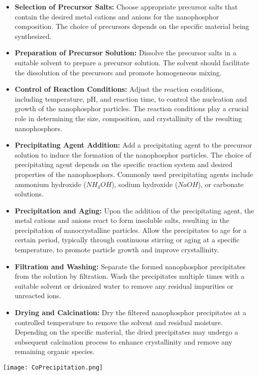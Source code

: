 \documentclass[../synthesis.tex]{subfiles}
\begin{document}
    \begin{itemize}
        \item \textbf{Selection of Precursor Salts:} Choose appropriate precursor salts that contain the 
        desired metal cations and anions for the nanophosphor composition. The choice of precursors depends on 
        the specific material being synthesized.
        \item \textbf{Preparation of Precursor Solution: } Dissolve the precursor salts in a suitable solvent 
        to prepare a precursor solution. The solvent should facilitate the dissolution of the precursors and 
        promote homogeneous mixing.
        \item \textbf{Control of Reaction Conditions: }Adjust the reaction conditions, including temperature, 
        pH, and reaction time, to control the nucleation and growth of the nanophosphor particles. The 
        reaction conditions play a crucial role in determining the size, composition, and crystallinity of the 
        resulting nanophosphors.
        \item \textbf{Precipitating Agent Addition: }Add a precipitating agent to the precursor solution to 
        induce the formation of the nanophosphor particles. The choice of precipitating agent depends on the 
        specific reaction system and desired properties of the nanophosphors. Commonly used precipitating 
        agents include ammonium hydroxide ($NH_4OH$), sodium hydroxide ($NaOH$), or carbonate solutions.
        \item \textbf{Precipitation and Aging: }Upon the addition of the precipitating agent, the metal 
        cations and anions react to form insoluble salts, resulting in the precipitation of nanocrystalline 
        particles. Allow the precipitates to age for a certain period, typically through continuous stirring 
        or aging at a specific temperature, to promote particle growth and improve crystallinity.
        \item \textbf{Filtration and Washing: }Separate the formed nanophosphor precipitates from the solution 
        by filtration. Wash the precipitates multiple times with a suitable solvent or deionized water to 
        remove any residual impurities or unreacted ions.
        \item \textbf{Drying and Calcination:} Dry the filtered nanophosphor precipitates at a controlled 
        temperature to remove the solvent and residual moisture. Depending on the specific material, the dried 
        precipitates may undergo a subsequent calcination process to enhance crystallinity and remove any 
        remaining organic species.
    \end{itemize}
    \begin{Figure}
        \centering
        \texttt{[image: CoPrecipitation.png]}
        \label{fig:CoPrecipitation}
    \end{Figure}
\end{document}
